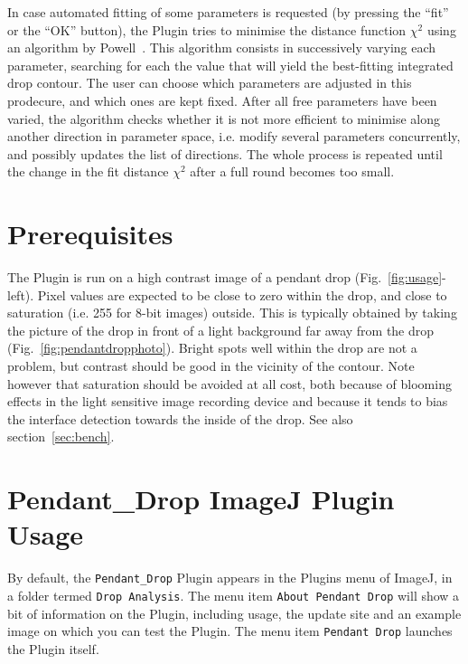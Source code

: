\documentclass[fleqn]{scrartcl}
\newcommand{\gouttependante}{\texttt{Pendant\_Drop}\xspace}
\begin{document}
 In case
automated fitting of some parameters is requested (by pressing the
``fit'' or the ``OK'' button), the Plugin tries to minimise the
distance function $\chi^2$ using an algorithm by
Powell~\cite{Powell1965,Brandt1992}. This algorithm consists in
successively varying each parameter, searching for each the value that
will yield the best-fitting integrated drop contour. The user can
choose which parameters are adjusted in this prodecure, and which ones
are kept fixed. After all free parameters have been varied, the
algorithm checks whether it is not more efficient to minimise along
another direction in parameter space, i.e. modify several parameters
concurrently, and possibly updates the list of directions. The whole
process is repeated until the change in the fit distance $\chi^2$
after a full round becomes too small.


\appendix


\section{Prerequisites}
\label{sec:prerequisites}

The Plugin is run on a high contrast image of a pendant drop
(Fig.~\ref{fig:usage}-left). Pixel values are expected to be close to
zero within the drop, and close to saturation (i.e. 255 for 8-bit
images) outside. This is typically obtained by taking the picture of
the drop in front of a light background far away from the drop
(Fig.~\ref{fig:pendantdropphoto}). Bright spots well within the drop
are not a problem, but contrast should be good in the vicinity of the
contour. Note however that saturation should be avoided at all cost,
both because of blooming effects in the light sensitive image
recording device and because it tends to bias the interface detection
towards the inside of the drop. See also section~\ref{sec:bench}.


\section{Pendant\_Drop ImageJ Plugin Usage}
\label{sec:usage}

By default, the \gouttependante Plugin appears in the Plugins menu of
ImageJ, in a folder termed \texttt{Drop Analysis}. The menu item
\texttt{About Pendant Drop} will show a bit of information on the
Plugin, including usage, the update site and an example image on which
you can test the Plugin. The menu item \texttt{Pendant Drop} launches
the Plugin itself.
\end{document}
